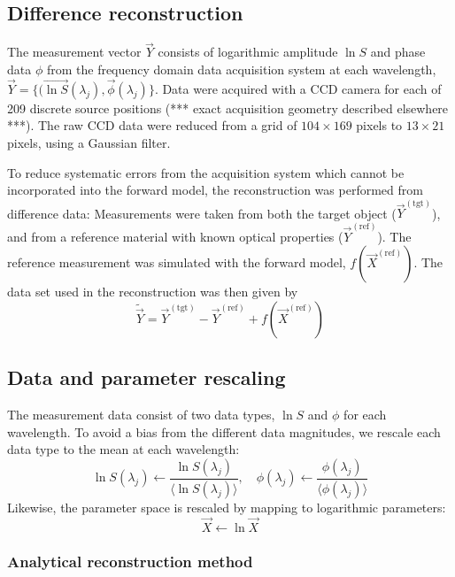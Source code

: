 \subsection{Difference reconstruction}
The measurement vector $\vec{Y}$ consists of logarithmic amplitude $\ln S$ and phase data $\phi$ from the frequency domain data acquisition system at each wavelength, $\vec{Y} = \lbrace (\vec{\ln S}(\lambda_j),\vec{\phi}(\lambda_j) \rbrace$. Data were acquired with a CCD camera for each of 209 discrete source positions (*** exact acquisition geometry described elsewhere ***). The raw CCD data were reduced from a grid of $104 \times 169$ pixels to $13 \times 21$ pixels, using a Gaussian filter.

To reduce systematic errors from the acquisition system which cannot be incorporated into the forward model, the reconstruction was performed from difference data: Measurements were taken from both the target object ($\vec{Y}^{(\mathrm{tgt})}$), and from a reference material with known optical properties ($\vec{Y}^{(\mathrm{ref})}$). The reference measurement was simulated with the forward model, $f(\vec{X}^{(\mathrm{ref})})$. The data set used in the reconstruction was then given by
\begin{equation}
\tilde{\vec{Y}} = \vec{Y}^{(\mathrm{tgt})} - \vec{Y}^{(\mathrm{ref})} + f(\vec{X}^{(\mathrm{ref})})
\end{equation}

\subsection{Data and parameter rescaling}
The measurement data consist of two data types, $\ln S$ and $\phi$ for each wavelength. To avoid a bias from the different data magnitudes, we rescale each data type to the mean at each wavelength:
\begin{equation}
\ln S(\lambda_j) \leftarrow \frac{\ln S(\lambda_j)}{\langle \ln S(\lambda_j) \rangle}, \quad \phi(\lambda_j) \leftarrow \frac{\phi(\lambda_j)}{\langle \phi(\lambda_j) \rangle}
\end{equation}
Likewise, the parameter space is rescaled by mapping to logarithmic parameters:
\begin{equation}
\vec{X} \leftarrow \ln \vec{X}
\end{equation}






\subsubsection{Analytical reconstruction method}
\label{sec:fourierrec}









